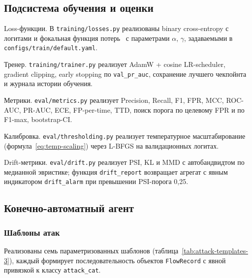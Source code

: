\subsection{Подсистема обучения и оценки}

Loss-функции. В \texttt{training/losses.py} реализованы binary
cross-entropy с логитами и фокальная функция
потерь~\cite{lin2017focal} с параметрами $\alpha$, $\gamma$,
задаваемыми в \texttt{configs/train/default.yaml}.

Тренер. \texttt{training/trainer.py} реализует AdamW + cosine
LR-scheduler, gradient clipping, early stopping по
\texttt{val\_pr\_auc}, сохранение лучшего чекпойнта и журнала
истории обучения.

Метрики. \texttt{eval/metrics.py} реализует Precision, Recall, F1,
FPR, MCC, ROC-AUC, PR-AUC, ECE, FP-per-time, TTD, поиск порога по
целевому FPR и по F1-max, bootstrap-CI.

Калибровка. \texttt{eval/thresholding.py} реализует температурное
масштабирование (формула~\ref{eq:temp-scaling}) через L-BFGS на
валидационных логитах.

Drift-метрики. \texttt{eval/drift.py} реализует PSI, KL и MMD с
автобандвидтом по медианной эвристике; функция
\texttt{drift\_report} возвращает агрегат с явным индикатором
\texttt{drift\_alarm} при превышении PSI-порога 0{,}25.

\subsection{Конечно-автоматный агент}

\subsubsection{Шаблоны атак}

Реализованы семь параметризованных шаблонов
(таблица~\ref{tab:attack-templates-3}), каждый формирует
последовательность объектов \texttt{FlowRecord} с явной привязкой к
классу \texttt{attack\_cat}.

